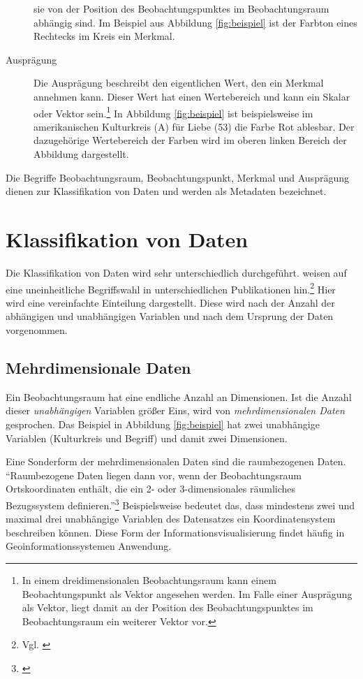 \documentclass[a4paper, 
               12pt,
               DIV=calc,
               version=first,
               pdftex,
               headsepline,
               footsepline,
               bibliography=totocnumbered,
               listof=numbered]{scrreprt}
\begin{document}
\begin{description}
sie von der Position des Beobachtungspunktes im Beobachtungsraum abhängig sind.
Im Beispiel aus Abbildung \ref{fig:beispiel} ist der Farbton eines Rechtecks im Kreis ein Merkmal.
\item[Ausprägung]
Die Ausprägung beschreibt den eigentlichen Wert, den ein Merkmal annehmen kann. Dieser Wert hat einen
Wertebereich und kann ein Skalar oder Vektor sein.\footnote{In einem dreidimensionalen Beobachtungsraum
kann einem Beobachtungspunkt als Vektor angesehen werden. Im Falle einer Ausprägung als Vektor, liegt damit
an der Position des Beobachtungspunktes im Beobachtungsraum ein weiterer Vektor vor.}
In Abbildung \ref{fig:beispiel} ist beispielsweise im amerikanischen Kulturkreis (A) für Liebe (53) die Farbe
Rot ablesbar. Der dazugehörige Wertebereich der Farben wird im oberen linken Bereich der Abbildung dargestellt.
\end{description}
Die Begriffe Beobachtungsraum, Beobachtungspunkt, Merkmal und Ausprägung dienen zur Klassifikation von Daten
und werden als Metadaten bezeichnet.

\section{Klassifikation von Daten}
\label{sec:KlassifikationDaten}

Die Klassifikation von Daten wird sehr unterschiedlich durchgeführt.
\cite{Schumann} weisen auf eine uneinheitliche Begriffswahl in unterschiedlichen
Publikationen hin.\footnote{Vgl. \citep[S.\,171]{Schumann}}
Hier wird eine vereinfachte Einteilung dargestellt. Diese wird nach der Anzahl der abhängigen und
unabhängigen Variablen und nach dem Ursprung der Daten vorgenommen.

\subsection{Mehrdimensionale Daten}
Ein Beobachtungsraum hat eine endliche Anzahl an Dimensionen. Ist die Anzahl
dieser \textit{unabhängigen} Variablen größer Eins, wird von \textit{mehrdimensionalen Daten} gesprochen. Das Beispiel
in Abbildung \ref{fig:beispiel} hat zwei unabhängige
Variablen (Kulturkreis und Begriff) und damit zwei Dimensionen.

Eine Sonderform der mehrdimensionalen Daten sind die raumbezogenen Daten.
"`Raumbezogene Daten liegen dann vor, wenn der Beobachtungsraum Ortskoordinaten enthält,
die ein 2- oder 3-dimensionales räumliches Bezugssystem definieren."'\footnote{\citep[S.\,220]{Schumann}}
Beispielsweise bedeutet das, dass mindestens zwei und maximal drei unabhängige Variablen des Datensatzes
ein Koordinatensystem beschreiben können. Diese Form der Informationsvisualisierung findet häufig
in Geoinformationssystemen Anwendung.
\end{document}
